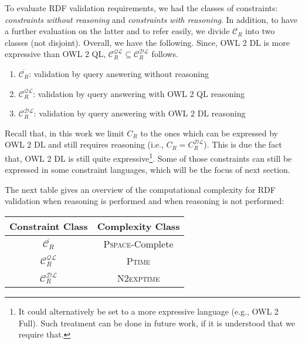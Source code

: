 \documentclass{llncs}
\newcommand{\tb}[1]{\todo[size=\small, color=green!40]{\textbf{Thomas:} #1}}
\newcommand{\er}[1]{\todo[size=\small, color=red!40]{\textbf{Erman:} #1}}
\begin{document}
To evaluate RDF validation requirements, we had the classes of constraints: \emph{constraints without reasoning} and \emph{constraints with reasoning}. 
In addition, to have a further evaluation on the latter and to refer easily, we divide $\mathcal{C}_R$ into two classes (not disjoint). 
Overall, we have the following. Since, OWL 2 DL is more expressive than OWL 2 QL,  $\mathcal{C}_R ^{\mathcal{QL}} \subseteq \mathcal{C}_R ^{\mathcal{DL}}$ follows. 
\begin{enumerate}\itemsep1em
	\item $\overline{\mathcal{C}_R}$: validation by query answering without reasoning
	\item $\mathcal{C}_R ^{\mathcal{QL}}$: validation by query answering with OWL 2 QL reasoning
	\item $\mathcal{C}_R ^{\mathcal{DL}}$: validation by query answering with OWL 2 DL reasoning
\end{enumerate}
Recall that, in this work we limit $C_R$ to the ones which can be expressed by OWL 2 DL and still requires reasoning  (i.e., $C_R = C_R ^{\mathcal{DL}}$). This is due the fact that, OWL 2 DL is still quite expressive\footnote{It could alternatively be set to a more expressive language (e.g., OWL 2 Full). Such treatment can be done in future work, if it is understood that we require that.}. 
Some of those constraints can still be expressed in some constraint languages, which will be the focus of next section.

The next table gives an overview of the computational complexity for RDF validation when reasoning is performed and when reasoning is not performed:


\begin{center}
\begin{tabular}{| c | c |}
\hline
\textbf{Constraint Class}  & \textbf{Complexity Class}\\
\hline
$\overline{\mathcal{C}_R}$ & \textsc{Pspace}-Complete \\
\hline
$\mathcal{C}_R ^{\mathcal{QL}}$ & \textsc{Ptime} \\
\hline
$\mathcal{C}_R ^{\mathcal{DL}}$ & \textsc{N2exptime} \\
\hline
\end{tabular}
\end{center}
\end{document}
